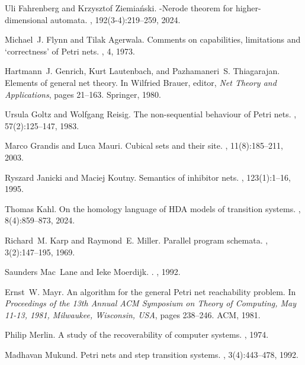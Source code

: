 \documentclass[runningheads,envcountsame]{llncs}
\begin{document}
\begin{thebibliography}{10}
Uli Fahrenberg and Krzysztof Ziemia{\'n}ski.
-{Nerode} theorem for higher-dimensional automata.
, 192(3-4):219--259, 2024.

Michael~J. Flynn and Tilak Agerwala.
\newblock Comments on capabilities, limitations and ‘correctness’ of
  {Petri} nets.
, 4, 1973.

Hartmann~J. Genrich, Kurt Lautenbach, and Pazhamaneri~S. Thiagarajan.
\newblock Elements of general net theory.
\newblock In Wilfried Brauer, editor, {\em Net Theory and Applications}, pages
  21--163. {Springer}, 1980.

Ursula Goltz and Wolfgang Reisig.
\newblock The non-sequential behaviour of {Petri} nets.
, 57(2):125--147, 1983.

Marco Grandis and Luca Mauri.
\newblock Cubical sets and their site.
, 11(8):185--211, 2003.

Ryszard Janicki and Maciej Koutny.
\newblock Semantics of inhibitor nets.
, 123(1):1--16, 1995.

Thomas Kahl.
\newblock On the homology language of {HDA} models of transition systems.
, 8(4):859--873,
  2024.

Richard~M. Karp and Raymond~E. Miller.
\newblock Parallel program schemata.
, 3(2):147--195, 1969.

Saunders Mac~Lane and Ieke Moerdijk.
.
, 1992.

Ernst~W. Mayr.
\newblock An algorithm for the general {Petri} net reachability problem.
\newblock In {\em Proceedings of the 13th Annual {ACM} Symposium on Theory of
  Computing, May 11-13, 1981, Milwaukee, Wisconsin, {USA}}, pages 238--246.
  {ACM}, 1981.

Philip Merlin.
\newblock A study of the recoverability of computer systems.
, 1974.

Madhavan Mukund.
\newblock Petri nets and step transition systems.
,
  3(4):443--478, 1992.


\end{thebibliography}
\end{document}
